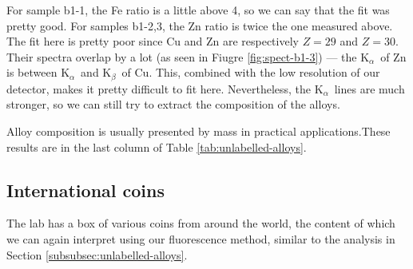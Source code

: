 \documentclass[11pt,a4paper,twoside,onecolumn]{article}
\newcommand{\Kalpha}{$\mathrm{K}_\alpha$~}
\newcommand{\Kbeta}{$\mathrm{K}_\beta$~}
\begin{document}
For sample b1-1, the Fe ratio is a little above 4, so we can say that the fit was pretty good. For samples b1-2,3, the Zn ratio is twice the one measured above. The fit here is pretty poor since Cu and Zn are respectively $Z=29$ and $Z=30$. Their spectra overlap by a lot (as seen in Fiugre \ref{fig:spect-b1-3}) --- the \Kalpha of Zn is between \Kalpha and \Kbeta of Cu. This, combined with the low resolution of our detector, makes it pretty difficult to fit here. Nevertheless, the \Kalpha lines are much stronger, so we can still try to extract the composition of the alloys.

Alloy composition is usually presented by mass in practical applications.These results are in the last column of Table \ref{tab:unlabelled-alloys}.

\subsection{International coins}
The lab has a box of various coins from around the world, the content of which we can again interpret using our fluorescence method, similar to the analysis in Section \ref{subsubsec:unlabelled-alloys}.
\end{document}
